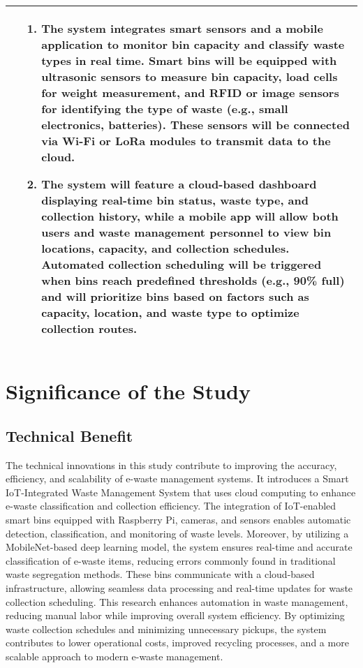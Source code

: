 \begin{table}[!htbp]
\begin{tabular}{p{}|p{}}
		\Paste{SO4} & 
		\begin{enumerate}
		\item The system integrates smart sensors and a mobile application to monitor bin capacity and classify waste types in real time. Smart bins will be equipped with ultrasonic sensors to measure bin capacity, load cells for weight measurement, and RFID or image sensors for identifying the type of waste (e.g., small electronics, batteries). These sensors will be connected via Wi-Fi or LoRa modules to transmit data to the cloud. 
		\item The system will feature a cloud-based dashboard displaying real-time bin status, waste type, and collection history, while a mobile app will allow both users and waste management personnel to view bin locations, capacity, and collection schedules. Automated collection scheduling will be triggered when bins reach predefined thresholds (e.g., 90\% full) and will prioritize bins based on factors such as capacity, location, and waste type to optimize collection routes.
		\end{enumerate} \\ \hline

    \end{tabular}
\end{table}

\section{Significance of the Study}

\subsection{Technical Benefit}

The technical innovations in this study contribute to improving the accuracy, efficiency, and scalability of e-waste management systems. It introduces a Smart IoT-Integrated Waste Management System that uses cloud computing to enhance e-waste classification and collection efficiency. The integration of IoT-enabled smart bins equipped with Raspberry Pi, cameras, and sensors enables automatic detection, classification, and monitoring of waste levels. Moreover, by utilizing a MobileNet-based deep learning model, the system ensures real-time and accurate classification of e-waste items, reducing errors commonly found in traditional waste segregation methods.  These bins communicate with a cloud-based infrastructure, allowing seamless data processing and real-time updates for waste collection scheduling. This research enhances automation in waste management, reducing manual labor while improving overall system efficiency. By optimizing waste collection schedules and minimizing unnecessary pickups, the system contributes to lower operational costs, improved recycling processes, and a more scalable approach to modern e-waste management.

